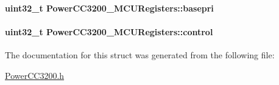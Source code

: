 \paragraph[{basepri}]{\setlength{\rightskip}{0pt plus 5cm}uint32\+\_\+t Power\+C\+C3200\+\_\+\+M\+C\+U\+Registers\+::basepri}\label{struct_power_c_c3200___m_c_u_registers_a9c7eb58ae648181513844561a0fcc486}
\paragraph[{control}]{\setlength{\rightskip}{0pt plus 5cm}uint32\+\_\+t Power\+C\+C3200\+\_\+\+M\+C\+U\+Registers\+::control}\label{struct_power_c_c3200___m_c_u_registers_a677d06a2066aecca92d9c587333f791c}


The documentation for this struct was generated from the following file\+:\begin{DoxyCompactItemize}
\item 
\hyperlink{_power_c_c3200_8h}{Power\+C\+C3200.\+h}\end{DoxyCompactItemize}
